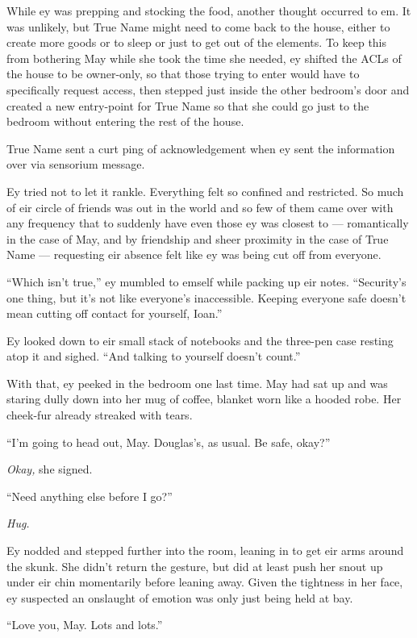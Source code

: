 While ey was prepping and stocking the food, another thought occurred to em. It was unlikely, but True Name might need to come back to the house, either to create more goods or to sleep or just to get out of the elements. To keep this from bothering May while she took the time she needed, ey shifted the ACLs of the house to be owner-only, so that those trying to enter would have to specifically request access, then stepped just inside the other bedroom's door and created a new entry-point for True Name so that she could go just to the bedroom without entering the rest of the house.

True Name sent a curt ping of acknowledgement when ey sent the information over via sensorium message.

Ey tried not to let it rankle. Everything felt so confined and restricted. So much of eir circle of friends was out in the world and so few of them came over with any frequency that to suddenly have even those ey was closest to — romantically in the case of May, and by friendship and sheer proximity in the case of True Name — requesting eir absence felt like ey was being cut off from everyone.

``Which isn't true,'' ey mumbled to emself while packing up eir notes. ``Security's one thing, but it's not like everyone's inaccessible. Keeping everyone safe doesn't mean cutting off contact for yourself, Ioan.''

Ey looked down to eir small stack of notebooks and the three-pen case resting atop it and sighed. ``And talking to yourself doesn't count.''

With that, ey peeked in the bedroom one last time. May had sat up and was staring dully down into her mug of coffee, blanket worn like a hooded robe. Her cheek-fur already streaked with tears.

``I'm going to head out, May. Douglas's, as usual. Be safe, okay?''

\emph{Okay,} she signed.

``Need anything else before I go?''

\emph{Hug.}

Ey nodded and stepped further into the room, leaning in to get eir arms around the skunk. She didn't return the gesture, but did at least push her snout up under eir chin momentarily before leaning away. Given the tightness in her face, ey suspected an onslaught of emotion was only just being held at bay.

``Love you, May. Lots and lots.''

